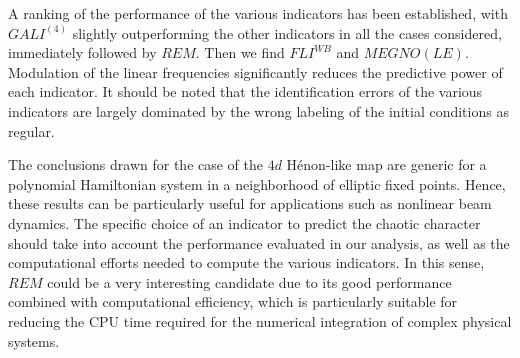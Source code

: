 A ranking of the performance of the various indicators has been established, with $GALI^{(4)}$ slightly outperforming the other indicators in all the cases considered, immediately followed by $REM$. Then we find $FLI^{{WB}}$ and $MEGNO(LE)$. Modulation of the linear frequencies significantly reduces the predictive power of each indicator. It should be noted that the identification errors of the various indicators are largely dominated by the wrong labeling of the initial conditions as regular. 

The conclusions drawn for the case of the $4d$ H\'enon-like map are generic for a polynomial Hamiltonian system in a neighborhood of elliptic fixed points. Hence, these results can be particularly useful for applications such as nonlinear beam dynamics. The specific choice of an indicator to predict the chaotic character should take into account the performance evaluated in our analysis, as well as the computational efforts needed to compute the various indicators. In this sense, $REM$ could be a very interesting candidate due to its good performance combined with computational efficiency, which is particularly suitable for reducing the CPU time required for the numerical integration of complex physical systems.
%
